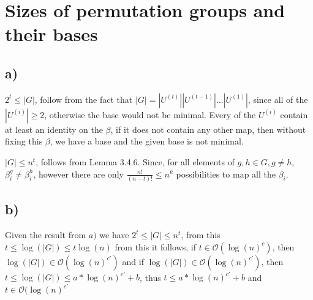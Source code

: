 \section{Sizes of permutation groups and their bases}

\subsection*{a)}

$2^t \leq |G|$, follow from the fact that $|G|=|U^{(t)}||U^{(t-1)}|\dots|U^{(1)}|$, since all of the $|U^(i)| \geq 2$, otherwise the base would not be minimal. Every of the $U^(i)$ contain at least an identity on the $\beta$, if it does not contain any other map, then without fixing this $\beta$, we have a base and the given base is not minimal.

$|G| \leq n^t$, follows from Lemma 3.4.6. Since, for all elements of $g,h \in G, g \neq h$, $\beta_i^g \neq \beta_i^h$, however there are only $\frac{n!}{(n-t)!} \leq n^k$ possibilities to map all the $\beta_i$.

\subsection*{b)}

Given the result from $a)$ we have $2^t \leq |G| \leq n^t$, from this $t \leq \log(|G|) \leq t \log(n)$ from this it follows, if $t \in \mathcal{O}(\log(n)^c)$, then $\log(|G|) \in \mathcal{O}(\log(n)^{c'})$ and 
if $\log(|G|) \in \mathcal{O}(\log(n)^{c'})$, then $t \leq \log(|G|) \leq a*\log(n)^{c'}+b$, thus $t \leq a*\log(n)^{c'}+b$ and $t \in \mathcal{O}(\log(n)^{c'}$